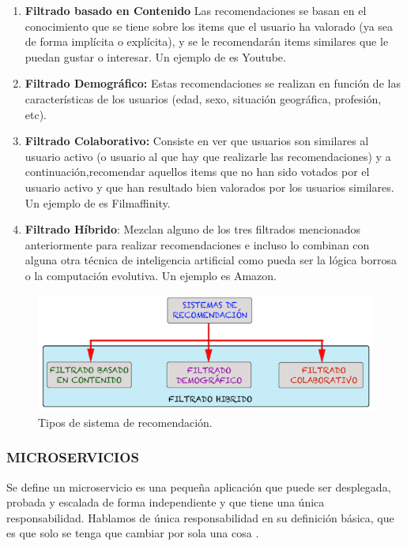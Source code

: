 \begin{enumerate}
\item \textbf{Filtrado basado en Contenido} Las recomendaciones se basan en el conocimiento que se tiene sobre los items que el usuario ha valorado (ya sea de forma implícita o explícita), y se le recomendarán items similares que le puedan gustar o interesar. Un ejemplo de es Youtube.
\item  \textbf{Filtrado Demográfico:} Estas recomendaciones se realizan en función de las características de los usuarios (edad, sexo, situación geográfica, profesión, etc).
\item \textbf{Filtrado Colaborativo:} Consiste en ver que usuarios son similares al usuario activo (o usuario al que hay que realizarle las recomendaciones) y a continuación,recomendar aquellos items que no han sido votados por el usuario activo y que han resultado bien valorados por los usuarios similares. Un ejemplo de es Filmaffinity.
\item \textbf{Filtrado Híbrido}:  Mezclan alguno de los tres filtrados mencionados anteriormente para realizar recomendaciones e incluso lo combinan con alguna otra técnica de inteligencia artificial como pueda ser la lógica borrosa o la computación evolutiva. Un ejemplo es Amazon.
\end{enumerate}


\begin{figure}[htbp]
\centering%
\includegraphics[width=\textwidth,keepaspectratio=true]{contextualizacion/MarcoReferencial/imgs/Sistema-de-Recomendacion-Clasificacion-jarroba.png}%
\caption{Tipos de sistema de recomendación.\cite{Quesonl99:online}} 

\label{fig:sisrec}
\end{figure}

\subsubsection{\textbf{MICROSERVICIOS}}
Se define un microservicio es una pequeña aplicación que puede ser desplegada, probada y escalada de forma independiente y que tiene una única responsabilidad\cite{7030212}. Hablamos de única responsabilidad en su definición básica, que es que solo se tenga que cambiar por sola una cosa \cite{Martin:2008:CCH:1388398}.

